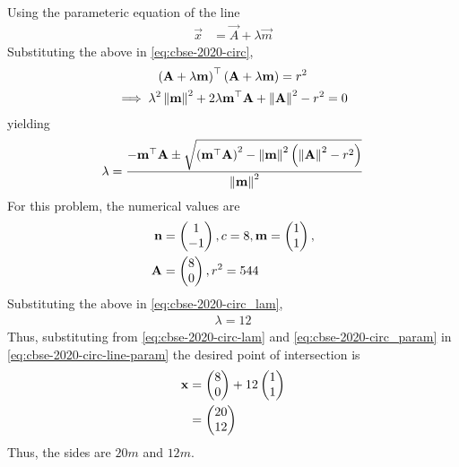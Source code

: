\documentclass[journal,12pt,twocolumn]{IEEEtran}
\begin{document}
\begin{enumerate}
		    Using the parameteric equation of the line 
		    \begin{align}
			    \label{eq:cbse-2020-circ-line-param}
			    \vec{x} &= \vec{A} + \lambda \vec{m}
		    \end{align}
			    Substituting the above in \eqref{eq:cbse-2020-circ}, 
		    \begin{multline}
			    \left( \mathbf{A} + \lambda \mathbf{m}\right)^{\top}
			    \left( \mathbf{A} + \lambda \mathbf{m}\right)
			    = r^2
			    \\
			    \implies \lambda^2\left\lVert\mathbf{m}\right\rVert^2+ 2 \lambda \mathbf{m}^{\top}\mathbf{A}
			    +\left\lVert\mathbf{A}\right\rVert^2 - r^2 = 0
		    \end{multline}
		    yielding 
		    {\small
		    \begin{align}
			    \label{eq:cbse-2020-circ_lam}
		\lambda = \frac{-\mathbf{m}^{\top}\mathbf{A}\pm \sqrt{\left(\mathbf{m}^{\top}\mathbf{A}\right)^2 -\left\lVert\mathbf{m}\right\rVert^2\left(\left\lVert\mathbf{A}\right\rVert^2 - r^2 \right)}}{\left\lVert\mathbf{m}\right\rVert^2}
		    \end{align}
		    }
		    For this problem, the numerical values are
		    \begin{align}
			    \label{eq:cbse-2020-circ_param}
			    \mathbf{n} &= \begin{pmatrix}1 \\ -1\end{pmatrix}, c = 8, 
		\mathbf{m} = \begin{pmatrix}1 \\ 1\end{pmatrix}, 
			    \\
			     \mathbf{A} &= \begin{pmatrix}8 \\ 0\end{pmatrix},  r^2 = 544
		    \end{align}
		    Substituting the above in 
			    \eqref{eq:cbse-2020-circ_lam}, 
		    \begin{align}
			    \lambda = 12
			    \label{eq:cbse-2020-circ-lam}
		    \end{align}
		    Thus, substituting from 
			    \eqref{eq:cbse-2020-circ-lam}
			    and 
			    \eqref{eq:cbse-2020-circ_param}
			    in 
			    \eqref{eq:cbse-2020-circ-line-param}
			    the desired point of intersection is 
		    \begin{align}
			    \mathbf{x} &= \begin{pmatrix}8 \\ 0\end{pmatrix} +  12 \begin{pmatrix}1 \\ 1\end{pmatrix}
			    \\
			    &= \begin{pmatrix}20 \\ 12\end{pmatrix}
		    \end{align}
		    Thus, the sides are $20m$ and $12m$.


\end{enumerate}
\end{document}
